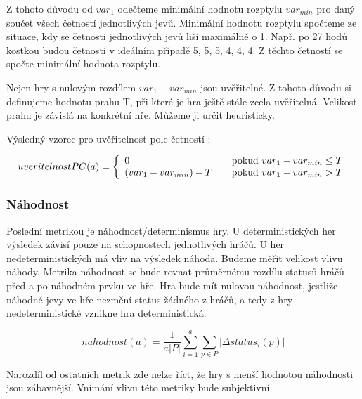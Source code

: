 Z tohoto důvodu od $var_1$ odečteme minimální hodnotu rozptylu $var_{min}$ pro daný součet všech četností jednotlivých jevů. Minimální hodnotu rozptylu spočteme ze situace, kdy se četnosti jednotlivých jevů liší maximálně o 1. Např. po 27 hodů kostkou budou četnosti v ideálním případě 5, 5, 5, 4, 4, 4. Z těchto četností se spočte minimální hodnota rozptylu.

Nejen hry s nulovým rozdílem $var_1 - var_{min}$ jsou uvěřitelné. Z tohoto důvodu si definujeme hodnotu prahu T, při které je hra ještě stále zcela uvěřitelná. Velikost prahu je závislá na konkrétní hře. Můžeme ji určit heuristicky.

Výsledný vzorec pro uvěřitelnost pole četností :

	\[
	uveritelnostPC(a) = \left\{
  \begin{array}{l l}
    0 & \quad \text{pokud $var_1 - var_{min} \leq T$}\\
    (var_1 - var_{min}) - T & \quad \text{pokud $var_1 - var_{min} > T$}
  \end{array} \right.
\]


\subsubsection{Náhodnost}

Poslední metrikou je náhodnost/determinismus hry. U deterministických her výsledek závisí pouze na schopnostech jednotlivých hráčů. U her nedeterministických má vliv na výsledek náhoda. Budeme měřit velikost vlivu náhody. Metrika náhodnost se bude rovnat průměrnému rozdílu statusů hráčů před a po náhodném prvku ve hře. Hra bude mít nulovou náhodnost, jestliže náhodné jevy ve hře nezmění status žádného z hráčů, a tedy z hry nedeterministické vznikne hra deterministická.

	\[
	nahodnost(a) = \frac{1}{a |P|}\sum_{i=1}^a{\sum_{p \in P} |\Delta status_i(p)|}
\]

Narozdíl od ostatních metrik zde nelze říct, že hry s menší hodnotou náhodnosti jsou zábavnější. Vnímání vlivu této metriky bude subjektivní.
